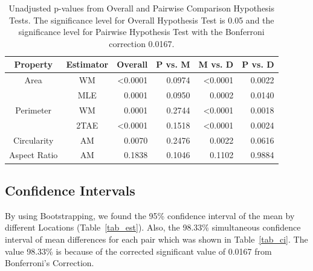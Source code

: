 \documentclass{article}\usepackage[]{graphicx}\usepackage[]{color}
\numberwithin{figure}{subsection} %
\numberwithin{table}{subsection} %
\begin{document}
\bigbreak
\begin{table}[!htbp]
\begin{center}
\begin{tabular}{ccrrrr}
\hline\hline
\multicolumn{1}{c}{Property}&\multicolumn{1}{c}{Estimator}&\multicolumn{1}{c}{Overall}&\multicolumn{1}{c}{P vs. M}&\multicolumn{1}{c}{M vs. D}&\multicolumn{1}{c}{P vs. D}\tabularnewline
\hline

Area&WM&\textless 0.0001&0.0974&\textless 0.0001&0.0022\tabularnewline
&MLE&0.0001&0.0950&0.0002&0.0140\tabularnewline
\hline

Perimeter&WM&0.0001&0.2744&\textless 0.0001&0.0018\tabularnewline
&2TAE&\textless 0.0001&0.1518&\textless 0.0001&0.0024\tabularnewline
\hline

Circularity&AM&0.0070&0.2476&0.0022&0.0616\tabularnewline
\hline

Aspect Ratio&AM&0.1838&0.1046&0.1102&0.9884\tabularnewline
\hline
\end{tabular}
\caption{Unadjusted p-values from Overall and Pairwise Comparison Hypothesis Tests. The significance level for Overall Hypothesis Test is 0.05 and the significance level for Pairwise Hypothesis Test with the Bonferroni correction 0.0167.\label{tab}}\end{center}
\end{table}


\newpage
\subsection{Confidence Intervals}








By using Bootstrapping, we found the 95\% confidence interval of the mean by different Locations (Table~\ref{tab_est}). Also, the 98.33\% simultaneous confidence interval of mean differences for each pair which was shown in Table~\ref{tab_ci}. The value 98.33\% is because of the corrected significant value of 0.0167 from Bonferroni's Correction. 
\end{document}
